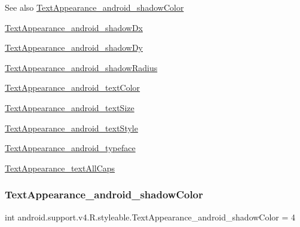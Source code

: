 \begin{DoxySeeAlso}{See also}
\hyperlink{classandroid_1_1support_1_1v4_1_1R_1_1styleable_a318e5701b3481a77b72df6e397f667e7}{Text\+Appearance\+\_\+android\+\_\+shadow\+Color} 

\hyperlink{classandroid_1_1support_1_1v4_1_1R_1_1styleable_aede7737f192898cea28cfa504def7c4c}{Text\+Appearance\+\_\+android\+\_\+shadow\+Dx} 

\hyperlink{classandroid_1_1support_1_1v4_1_1R_1_1styleable_ad8fae45d7f1f386895cd3d3387477bb8}{Text\+Appearance\+\_\+android\+\_\+shadow\+Dy} 

\hyperlink{classandroid_1_1support_1_1v4_1_1R_1_1styleable_a6d669faeb8b3585d3807aa0124a6bf14}{Text\+Appearance\+\_\+android\+\_\+shadow\+Radius} 

\hyperlink{classandroid_1_1support_1_1v4_1_1R_1_1styleable_ad91d5229f5579d10576dd454b5a76955}{Text\+Appearance\+\_\+android\+\_\+text\+Color} 

\hyperlink{classandroid_1_1support_1_1v4_1_1R_1_1styleable_a040fc8f325c7f3437cb0de7391a9f66b}{Text\+Appearance\+\_\+android\+\_\+text\+Size} 

\hyperlink{classandroid_1_1support_1_1v4_1_1R_1_1styleable_ad2a5ecd007f593b55beb33c50e15db62}{Text\+Appearance\+\_\+android\+\_\+text\+Style} 

\hyperlink{classandroid_1_1support_1_1v4_1_1R_1_1styleable_a9e3a6684a7a098b28524ba5b3ce100f9}{Text\+Appearance\+\_\+android\+\_\+typeface} 

\hyperlink{classandroid_1_1support_1_1v4_1_1R_1_1styleable_a1e1460f50d695fa2b57fa98b9d12a63e}{Text\+Appearance\+\_\+text\+All\+Caps} 
\end{DoxySeeAlso}
\mbox{\label{classandroid_1_1support_1_1v4_1_1R_1_1styleable_a318e5701b3481a77b72df6e397f667e7}} 
\subsubsection{\texorpdfstring{Text\+Appearance\+\_\+android\+\_\+shadow\+Color}{TextAppearance\_android\_shadowColor}}
{\footnotesize\ttfamily int android.\+support.\+v4.\+R.\+styleable.\+Text\+Appearance\+\_\+android\+\_\+shadow\+Color = 4\hspace{0.3cm}{\ttfamily [static]}}


